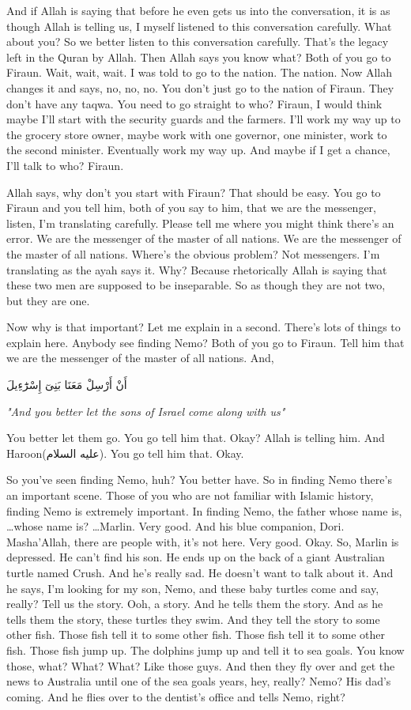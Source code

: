 \documentclass[12pt]{article}
\newcommand{\as}{\textarabic{(عليه السلام)}}
\begin{document}
And if Allah is saying that before he even gets us into the conversation, it is as though Allah is telling us, I myself listened to this conversation carefully. What about you? So we better listen to this conversation carefully. That's the legacy left in the Quran by Allah. Then Allah says you know what? Both of you go to Firaun. Wait, wait, wait. I was told to go to the nation. The nation. Now Allah changes it and says, no, no, no. You don't just go to the nation of Firaun. They don't have any taqwa. You need to go straight to who? Firaun, I would think maybe I'll start with the security guards and the farmers. I'll work my way up to the grocery store owner, maybe work with one governor, one minister, work to the second minister. Eventually work my way up. And maybe if I get a chance, I'll talk to who? Firaun. 
   
Allah says, why don't you start with Firaun? That should be easy. You go to Firaun and you tell him, both of you say to him, that we are the messenger, listen, I'm translating carefully. Please tell me where you might think there's an error. We are the messenger of the master of all nations. We are the messenger of the master of all nations. Where's the obvious problem? Not messengers. I'm translating as the ayah says it. Why? Because rhetorically Allah is saying that these two men are supposed to be inseparable. So as though they are not two, but they are one. 
   
Now why is that important? Let me explain in a second. There's lots of things to explain here. Anybody see finding Nemo? Both of you go to Firaun. Tell him that we are the messenger of the master of all nations. And,

\textarabic{أَنْ أَرْسِلْ مَعَنَا بَنِىٓ إِسْرَٰٓءِيلَ} 

\textit{"And you better let the sons of Israel come along with us"} 
   
You better let them go. You go tell him that. Okay? Allah is telling him. And Haroon\as{}. You go tell him that. Okay. 

So you've seen finding Nemo, huh? You better have. So in finding Nemo there's an important scene. Those of you who are not familiar with Islamic history, finding Nemo is extremely important. In finding Nemo, the father whose name is, \dots whose name is? \dots Marlin. Very good. And his blue companion, Dori. Masha'Allah, there are people with, it's not here. Very good. Okay. So, Marlin is depressed. He can't find his son. He ends up on the back of a giant Australian turtle named Crush. And he's really sad. He doesn't want to talk about it. And he says, I'm looking for my son, Nemo, and these baby turtles come and say, really? Tell us the story. Ooh, a story. And he tells them the story. And as he tells them the story, these turtles they swim. And they tell the story to some other fish. Those fish tell it to some other fish. Those fish tell it to some other fish. Those fish jump up. The dolphins jump up and tell it to sea goals. You know those, what? What? What? Like those guys. And then they fly over and get the news to Australia until one of the sea goals years, hey, really? Nemo? His dad's coming. And he flies over to the dentist's office and tells Nemo, right? 
\end{document}
